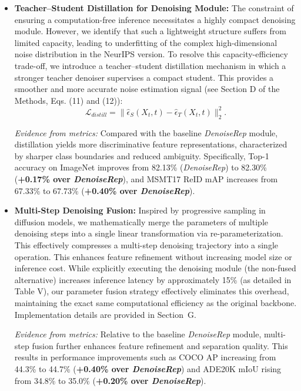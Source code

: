 \documentclass[11pt]{article}
\begin{document}
\begin{itemize}

    \item \textbf{Teacher–Student Distillation for Denoising Module:}  
    The constraint of ensuring a computation-free inference necessitates a highly compact denoising module. However, we identify that such a lightweight structure suffers from limited capacity, leading to underfitting of the complex high-dimensional noise distribution in the NeurIPS version. To resolve this capacity-efficiency trade-off, we introduce a teacher–student distillation mechanism in which a stronger teacher denoiser supervises 
    a compact student. This provides a smoother and more accurate noise estimation signal (see Section D of the Methods, Eqs. (11) and (12)):
    \[
    \mathcal{L}_{distill} = \|\hat{\epsilon}_S(X_t,t) - \hat{\epsilon}_T(X_t,t)\|_2^2.
    \]

    \textit{Evidence from metrics:}  
    Compared with the baseline \textit{DenoiseRep} module, distillation yields more discriminative feature representations, characterized by sharper class boundaries and reduced ambiguity. Specifically, Top-1 accuracy on ImageNet 
    improves from 82.13\% (\textit{DenoiseRep}) to 82.30\% (\textbf{+0.17\% over \textit{DenoiseRep}}), and MSMT17 
    ReID mAP increases from 67.33\% to 67.73\% (\textbf{+0.40\% over \textit{DenoiseRep}}).

    \item \textbf{Multi-Step Denoising Fusion:}  
    Inspired by progressive sampling in diffusion models, we mathematically merge the parameters of multiple denoising steps into a single linear transformation via re-parameterization. This effectively compresses a multi-step denoising trajectory into a single operation. This enhances feature refinement without increasing model size or inference cost. While explicitly executing the denoising module (the non-fused alternative) increases inference latency by approximately 15\% (as detailed in Table V), our parameter fusion strategy effectively eliminates this overhead, maintaining the exact same computational efficiency as the original backbone. Implementation details are provided in Section~G.

    \textit{Evidence from metrics:}  
    Relative to the baseline \textit{DenoiseRep} module, multi-step fusion further enhances feature refinement 
    and separation quality. This results in performance improvements such as COCO AP increasing 
    from 44.3\% to 44.7\% (\textbf{+0.40\% over \textit{DenoiseRep}}) and ADE20K mIoU rising from 34.8\% 
    to 35.0\% (\textbf{+0.20\% over \textit{DenoiseRep}}).
\end{itemize}
\end{document}
